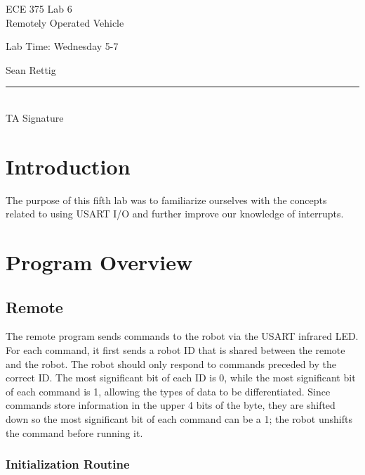 \documentclass[12pt,letterpaper]{article}
\begin{document}
\begin{titlepage}
    \vspace*{4cm}
    \begin{flushright}
    {\huge
        ECE 375 Lab 6\\[1cm]
    }
    {\large
        Remotely Operated Vehicle
    }
    \end{flushright}
    \begin{flushleft}
    Lab Time: Wednesday 5-7
    \end{flushleft}
    \begin{flushright}
    Sean Rettig
    \vfill
    \rule{5in}{.5mm}\\
    TA Signature
    \end{flushright}

\end{titlepage}

\section{Introduction}

The purpose of this fifth lab was to familiarize ourselves with the concepts
related to using USART I/O and further improve our knowledge of interrupts.

\section{Program Overview}

\subsection{Remote}

The remote program sends commands to the robot via the USART infrared LED.  For
each command, it first sends a robot ID that is shared between the remote and
the robot.  The robot should only respond to commands preceded by the correct
ID.  The most significant bit of each ID is 0, while the most significant bit
of each command is 1, allowing the types of data to be differentiated.  Since
commands store information in the upper 4 bits of the byte, they are shifted
down so the most significant bit of each command can be a 1; the robot unshifts
the command before running it.

\subsubsection{Initialization Routine}
\end{document}
